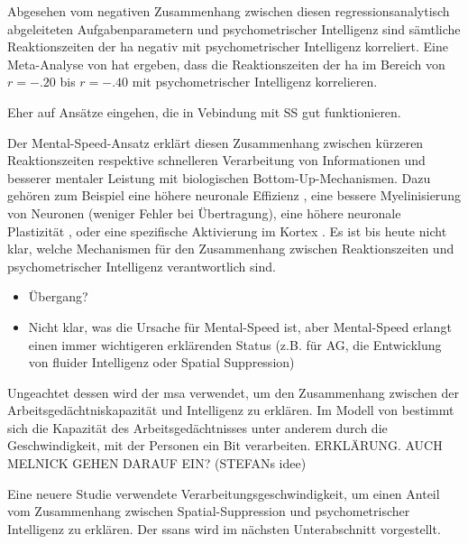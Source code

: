 \documentclass[11pt, twoside, a4paper]{book}		%
\begin{document}
Abgesehen vom negativen Zusammenhang zwischen diesen regressionsanalytisch abgeleiteten Aufgabenparametern und psychometrischer Intelligenz sind sämtliche  Reaktionszeiten der \gls{ha} negativ mit psychometrischer Intelligenz korreliert. Eine Meta-Analyse von \citet{Sheppard2008} hat ergeben, dass die Reaktionszeiten der \gls{ha} im Bereich von $r=-.20$ bis $r=-.40$ mit psychometrischer Intelligenz korrelieren. 

Eher auf Ansätze eingehen, die in Vebindung mit SS gut funktionieren.


Der Mental-Speed-Ansatz \citep{Jensen1982a, Jensen1982b, Vernon1983} erklärt diesen Zusammenhang zwischen kürzeren Reaktionszeiten respektive schnelleren Verarbeitung von Informationen und besserer mentaler Leistung mit biologischen Bottom-Up-Mechanismen. Dazu gehören zum Beispiel eine höhere neuronale Effizienz \citep{Bates1995, Hendrickson1980, Reed1992}, eine bessere Myelinisierung von Neuronen \citep{Miller1994} (weniger Fehler bei Übertragung), eine höhere neuronale Plastizität \citep{Garlick2002}, oder eine spezifische Aktivierung im Kortex \citep{Neubauer1995}. Es ist bis heute nicht klar, welche Mechanismen für den Zusammenhang zwischen Reaktionszeiten und psychometrischer Intelligenz verantwortlich sind. 

\begin{itemize}
	\item Übergang?
	\item Nicht klar, was die Ursache für Mental-Speed ist, aber Mental-Speed erlangt einen immer wichtigeren erklärenden Status (z.B. für AG, die Entwicklung von fluider Intelligenz oder Spatial Suppression)
\end{itemize}

Ungeachtet dessen wird der \gls{msa} verwendet, um den Zusammenhang zwischen der Arbeitsgedächtniskapazität und Intelligenz \citep[siehe][]{Ackerman2005} zu erklären. Im Modell von \citet{Lehrl1988, Lehrl1990} bestimmt sich die Kapazität des Arbeitsgedächtnisses unter anderem durch die Geschwindigkeit, mit der Personen ein Bit verarbeiten. ERKLÄRUNG. AUCH MELNICK GEHEN DARAUF EIN? (STEFANs idee) 

Eine neuere Studie \citep{Melnick2013} verwendete Verarbeitungsgeschwindigkeit, um einen Anteil vom  Zusammenhang zwischen Spatial-Suppression und psychometrischer Intelligenz zu erklären. Der \gls{ssans} wird im nächsten Unterabschnitt vorgestellt.

\end{document}
